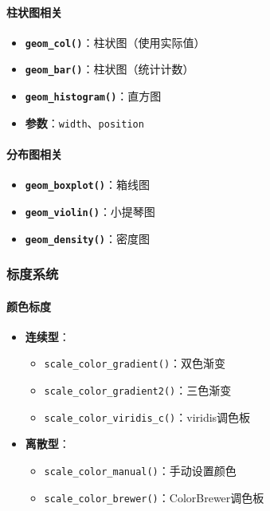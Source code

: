 \documentclass[
  twoside]{book}
\providecommand{\tightlist}{%
  \setlength{\itemsep}{0pt}\setlength{\parskip}{0pt}}
\begin{document}
\hypertarget{ux67f1ux72b6ux56feux76f8ux5173}{%
\paragraph{柱状图相关}\label{ux67f1ux72b6ux56feux76f8ux5173}}

\begin{itemize}
\tightlist
\item
  \textbf{\texttt{geom\_col()}}：柱状图（使用实际值）
\item
  \textbf{\texttt{geom\_bar()}}：柱状图（统计计数）
\item
  \textbf{\texttt{geom\_histogram()}}：直方图
\item
  \textbf{参数}：\texttt{width}、\texttt{position}
\end{itemize}

\hypertarget{ux5206ux5e03ux56feux76f8ux5173}{%
\paragraph{分布图相关}\label{ux5206ux5e03ux56feux76f8ux5173}}

\begin{itemize}
\tightlist
\item
  \textbf{\texttt{geom\_boxplot()}}：箱线图
\item
  \textbf{\texttt{geom\_violin()}}：小提琴图
\item
  \textbf{\texttt{geom\_density()}}：密度图
\end{itemize}

\hypertarget{ux6807ux5ea6ux7cfbux7edf}{%
\subsubsection{标度系统}\label{ux6807ux5ea6ux7cfbux7edf}}

\hypertarget{ux989cux8272ux6807ux5ea6}{%
\paragraph{颜色标度}\label{ux989cux8272ux6807ux5ea6}}

\begin{itemize}
\tightlist
\item
  \textbf{连续型}：

  \begin{itemize}
  \tightlist
  \item
    \texttt{scale\_color\_gradient()}：双色渐变
  \item
    \texttt{scale\_color\_gradient2()}：三色渐变
  \item
    \texttt{scale\_color\_viridis\_c()}：viridis调色板
  \end{itemize}
\item
  \textbf{离散型}：

  \begin{itemize}
  \tightlist
  \item
    \texttt{scale\_color\_manual()}：手动设置颜色
  \item
    \texttt{scale\_color\_brewer()}：ColorBrewer调色板
  \end{itemize}
\end{itemize}
\end{document}
